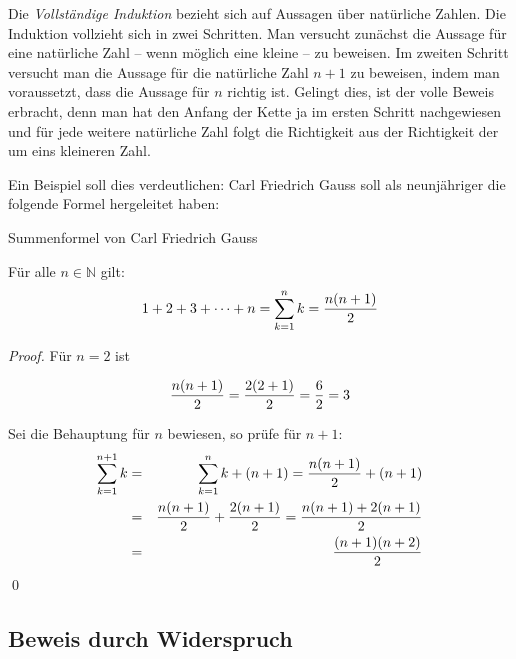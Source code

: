 Die \textsl{Vollständige Induktion} bezieht sich auf Aussagen über natürliche Zahlen. Die Induktion vollzieht sich in zwei Schritten. Man versucht zunächst die Aussage für eine natürliche Zahl -- wenn möglich eine kleine -- zu beweisen. Im zweiten Schritt versucht man die Aussage für die natürliche Zahl $n+1$ zu beweisen, indem man voraussetzt, dass die Aussage für $n$ richtig ist. Gelingt dies, ist der volle Beweis erbracht, denn man hat den Anfang der Kette ja im ersten Schritt nachgewiesen und für jede weitere natürliche Zahl folgt die Richtigkeit aus der Richtigkeit der um eins kleineren Zahl.

Ein Beispiel soll dies verdeutlichen: Carl Friedrich Gauss soll als neunjähriger die folgende Formel hergeleitet haben:

\begin{theorem}
Summenformel von Carl Friedrich Gauss
\begin{claim}
Für alle $n\in \mathbb{N}$ gilt:
\[ 1+2+3+ \dots +n = \sum_{k=1}^{n}k = {n(n+1)\over 2} \]
\end{claim}
\begin{proof}
Für $n=2$ ist

\[ {n(n+1)\over 2} = {2(2+1)\over 2} = {6\over 2} = 3 \]

Sei die Behauptung für $n$ bewiesen, so prüfe für $n+1$:
\begin{eqnarray*}
\sum_{k=1}^{n+1} k &=& \sum_{k=1}^{n} k  + (n+1) = {n(n+1)\over 2} +(n+1) \\
 &=& {n(n+1)\over 2} +{2(n+1)\over 2} = {n(n+1)+2(n+1) \over 2} \\
 &=& {(n+1)(n+2) \over 2}
\end{eqnarray*}
\qed
\end{proof}

\end{theorem}





\subsection{Beweis durch Widerspruch}

